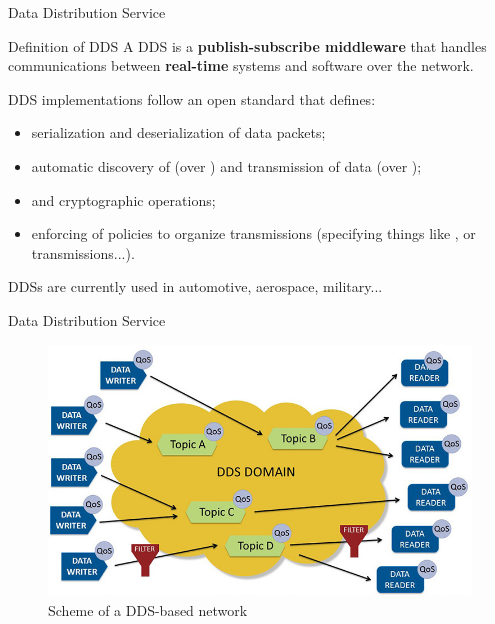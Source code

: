 \begin{frame}{Data Distribution Service}
\begin{block}{Definition of DDS}
    A DDS is a \textbf{publish-subscribe middleware} that handles communications between \textbf{real-time} systems and software over the network.
\end{block}
DDS implementations follow an open standard that defines:
\begin{itemize}
    \item serialization and deserialization of data packets;
    \item automatic discovery of  (over ) and transmission of data (over );
    \item {} and cryptographic operations;
    \item enforcing of  policies to organize transmissions (specifying things like ,  or  transmissions...).
\end{itemize}
DDSs are currently used in automotive, aerospace, military...
\end{frame}
\begin{frame}{Data Distribution Service}
\begin{figure}
    \centering
    \includegraphics[width=.85\textwidth]{ddsDomain.jpg}
    \caption{Scheme of a DDS-based network}
    \label{fig:ddsdomain}
\end{figure}
\end{frame}
